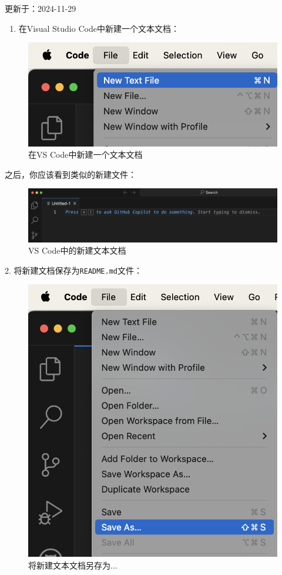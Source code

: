 \documentclass[]{ctexbook}
\providecommand{\tightlist}{%
  \setlength{\itemsep}{0pt}\setlength{\parskip}{0pt}}
\theoremstyle{definition}
\theoremstyle{definition}
\theoremstyle{definition}
\theoremstyle{definition}
\theoremstyle{remark}
\begin{document}
更新于：2024-11-29

\begin{enumerate}
\def\labelenumi{\arabic{enumi}.}
\tightlist
\item
  在Visual Studio Code中新建一个文本文档：
\end{enumerate}

\begin{figure}

{\centering \includegraphics[width=0.6\linewidth]{img/vscode/mkreadme_mknewfile} 

}

\caption{在VS Code中新建一个文本文档}\label{fig:mkreadme-mknewfile}
\end{figure}

之后，你应该看到类似的新建文件：

\begin{figure}

{\centering \includegraphics[width=1\linewidth]{img/vscode/mkreadme_newfile} 

}

\caption{VS Code中的新建文本文档}\label{fig:mkreadme-newfile}
\end{figure}

2. 将新建文档保存为\texttt{README.md}文件：

\begin{figure}

{\centering \includegraphics[width=0.7\linewidth]{img/vscode/mkreadme_saveas1} 

}

\caption{将新建文本文档另存为...}\label{fig:mkreadme-saveas1}
\end{figure}
\end{document}
